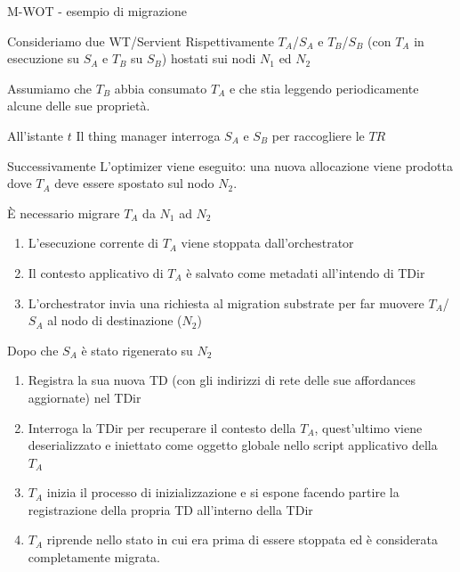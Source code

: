 \documentclass{beamer}
\begin{document}
\begin{frame}[allowframebreaks]{M-WOT - esempio di migrazione}
\begin{block}{Consideriamo due WT/Servient}
	Rispettivamente $T_A$/$S_A$ e $T_B$/$S_B$ (con $T_A$ in esecuzione su $S_A$ e $T_B$ su $S_B$) hostati sui nodi $N_1$ ed $N_2$
\end{block}
\begin{block}{Assumiamo che}
	$T_B$ abbia consumato $T_A$ e che stia leggendo periodicamente alcune delle sue proprietà.
\end{block}
\begin{block}{All'istante $t$ }
	Il thing manager interroga $S_A$ e $S_B$ per raccogliere le $TR$
\end{block}
\begin{block}{Successivamente}
	L'optimizer viene eseguito: una nuova allocazione viene prodotta dove $T_A$ deve essere spostato sul nodo $N_2$. 
\end{block}

\begin{block}{È necessario migrare $T_A$ da $N_1$ ad $N_2$}
	\begin{enumerate}
		\item L'esecuzione corrente di $T_A$ viene stoppata dall'orchestrator
		\item Il contesto applicativo di $T_A$ è salvato come metadati all'intendo di TDir
		\item L'orchestrator invia una richiesta al migration substrate per far muovere $T_A$/$S_A$ al nodo di destinazione ($N_2$)
	\end{enumerate}
\end{block}

\pagebreak

\begin{block}{Dopo che $S_A$ è stato rigenerato su $N_2$}
	\begin{enumerate}
		\item Registra la sua nuova TD (con gli indirizzi di rete delle sue affordances aggiornate) nel TDir
		\item Interroga la TDir per recuperare il contesto della $T_A$, quest'ultimo viene deserializzato e iniettato come oggetto globale nello script applicativo della $T_A$
		\item $T_A$ inizia il processo di inizializzazione e si espone facendo partire la registrazione della propria TD all'interno della TDir
		\item $T_A$ riprende nello stato in cui era prima di essere stoppata ed è considerata completamente migrata.
	\end{enumerate}
\end{block}


\end{frame}
\end{document}
